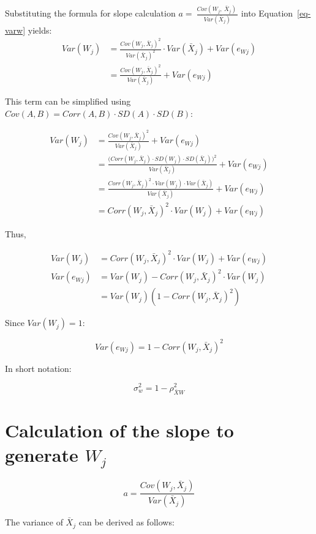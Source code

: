 \documentclass[
  letterpaper,
  11pt,
  english,
  singlespacing,
  headsepline,
  openany]{MastersDoctoralThesis}
\begin{document}
Substituting the formula for slope calculation
\(a=\ \frac{Cov(W_j,{\ \bar{X}}_j)\ }{Var({\bar{X}}_j)}\) into
Equation~\ref{eq-varw} yields: \[
\begin{aligned}
Var(W_j)
&= \frac{Cov(W_j, \bar{X}_j)^2}{Var(\bar{X}_j)^2} \cdot Var(\bar{X}_j) 
+ Var(e_{Wj}) \\
&= \frac{Cov(W_j, \bar{X}_j)^2}{Var(\bar{X}_j)} 
+ Var(e_{Wj})
\end{aligned}
\]

This term can be simplified using
\(Cov(A,B) = Corr(A,B)\cdot SD(A)\cdot SD(B)\):

\[
\begin{aligned}
Var(W_j)
&= \frac{Cov(W_j, \bar{X}_j)^2}{Var(\bar{X}_j)} + Var(e_{Wj}) \\
&= \frac{\bigl(Corr(W_j, \bar{X}_j)\cdot SD(W_j)\cdot SD(\bar{X}_j)\bigr)^2}{Var(\bar{X}_j)} 
+ Var(e_{Wj}) \\
&= \frac{Corr(W_j, \bar{X}_j)^2 \cdot Var(W_j)\cdot Var(\bar{X}_j)}{Var(\bar{X}_j)} 
+ Var(e_{Wj}) \\
&= Corr(W_j, \bar{X}_j)^2 \cdot Var(W_j) + Var(e_{Wj})
\end{aligned}
\]

Thus,

\[
\begin{aligned}
Var(W_j)
&= Corr(W_j, \bar{X}_j)^2 \cdot Var(W_j) + Var(e_{Wj}) \\
Var(e_{Wj})
&= Var(W_j) - Corr(W_j, \bar{X}_j)^2 \cdot Var(W_j) \\
&= Var(W_j)\left(1 - Corr(W_j, \bar{X}_j)^2\right)
\end{aligned}
\]

Since \(Var(W_j)=1\):

\[
Var(e_{Wj}) = 1 - Corr(W_j, \bar{X}_j)^2
\]

In short notation:

\[
\sigma_w^2 = 1 - \rho_{\bar{X}W}^2
\]

\section{\texorpdfstring{Calculation of the slope to generate
\(W_j\)}{Calculation of the slope to generate W\_j}}\label{calculation-of-the-slope-to-generate-w_j}

\[
a = \frac{Cov(W_j, \bar{X}_j)}{Var(\bar{X}_j)}
\]

The variance of \(\bar{X}_j\) can be derived as follows:
\end{document}
